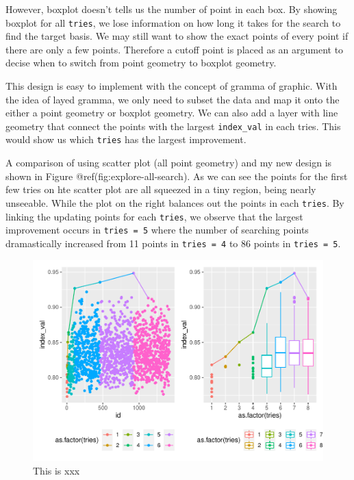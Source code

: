 \documentclass[12pt]{article}
\begin{document}
However, boxplot doesn't tells us the number of point in each box. By
showing boxplot for all \texttt{tries}, we lose information on how long
it takes for the search to find the target basis. We may still want to
show the exact points of every point if there are only a few points.
Therefore a cutoff point is placed as an argument to decise when to
switch from point geometry to boxplot geometry.

This design is easy to implement with the concept of gramma of graphic.
With the idea of layed gramma, we only need to subset the data and map
it onto the either a point geometry or boxplot geometry. We can also add
a layer with line geometry that connect the points with the largest
\texttt{index\_val} in each tries. This would show us which
\texttt{tries} has the largest improvement.

A comparison of using scatter plot (all point geometry) and my new
design is shown in Figure @ref(fig:explore-all-search). As we can see
the points for the first few tries on hte scatter plot are all squeezed
in a tiny region, being nearly unseeable. While the plot on the right
balances out the points in each \texttt{tries}. By linking the updating
points for each \texttt{tries}, we observe that the largest improvement
occurs in \texttt{tries\ =\ 5} where the number of searching points
dramastically increased from 11 points in \texttt{tries\ =\ 4} to 86
points in \texttt{tries\ =\ 5}.

\begin{figure}
\centering
\includegraphics{paper_files/figure-latex/explore-all-search-1.pdf}
\caption{This is xxx}
\end{figure}
\end{document}
